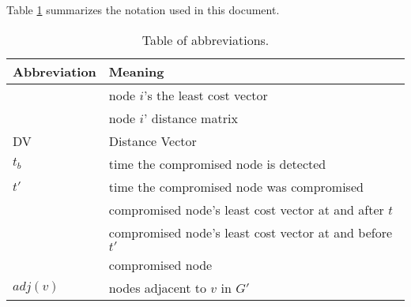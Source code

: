Table \ref{tab:abbrev} summarizes the notation used in this document. 

\begin{table}[t]
\begin{center}
\begin{tabular}{l l} 
\hline \hline
   	{\bf Abbreviation} & {\bf Meaning} \\
		  \hline 
			\minvi & node $i$'s the least cost vector \\
			\dmatrixi & node $i$' distance matrix \\
			DV & Distance Vector \\
			\hline
			$t_b$ & time the compromised node is detected \\
			$t'$ & time the compromised node was compromised \\
			\badvector & compromised node's least cost vector at and after $t$  \\
			\oldvector & compromised node's least cost vector at and before $t'$ \\
			\bad & compromised node \\ 
			$adj(v)$ & nodes adjacent to $v$ in $G'$ \\ 
			\hline \hline
			\end{tabular}
			\end{center}
\caption{Table of abbreviations.} 
\label{tab:abbrev}
\end{table}

